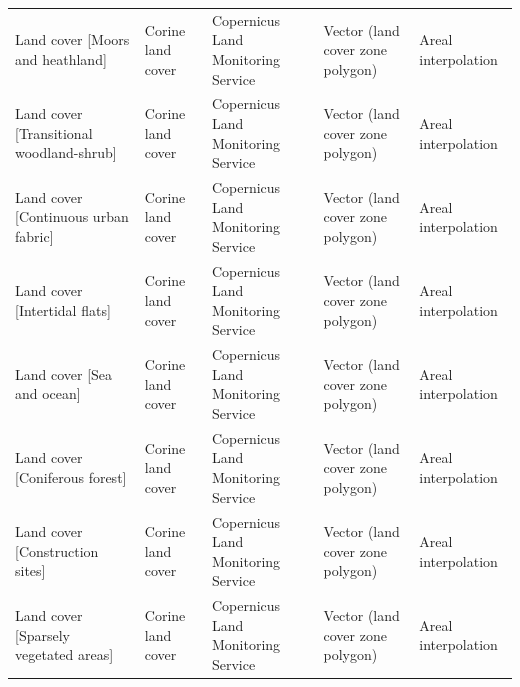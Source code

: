 \documentclass[fleqn,10pt]{wlscirep}
\begin{document}
\begin{longtable}{p{}p{}p{}p{}p{}}
                                                                        Land cover [Moors and heathland] &                  Corine land cover  &                                         Copernicus Land Monitoring Service  &  Vector (land cover zone polygon)  &                            Areal interpolation  \\
                                                                Land cover [Transitional woodland-shrub] &                  Corine land cover  &                                         Copernicus Land Monitoring Service  &  Vector (land cover zone polygon)  &                            Areal interpolation  \\
                                                                    Land cover [Continuous urban fabric] &                  Corine land cover  &                                         Copernicus Land Monitoring Service  &  Vector (land cover zone polygon)  &                            Areal interpolation  \\
                                                                            Land cover [Intertidal flats] &                  Corine land cover  &                                         Copernicus Land Monitoring Service  &  Vector (land cover zone polygon)  &                            Areal interpolation  \\
                                                                                Land cover [Sea and ocean] &                  Corine land cover  &                                         Copernicus Land Monitoring Service  &  Vector (land cover zone polygon)  &                            Areal interpolation  \\
                                                                            Land cover [Coniferous forest] &                  Corine land cover  &                                         Copernicus Land Monitoring Service  &  Vector (land cover zone polygon)  &                            Areal interpolation  \\
                                                                        Land cover [Construction sites] &                  Corine land cover  &                                         Copernicus Land Monitoring Service  &  Vector (land cover zone polygon)  &                            Areal interpolation  \\
                                                                    Land cover [Sparsely vegetated areas] &                  Corine land cover  &                                         Copernicus Land Monitoring Service  &  Vector (land cover zone polygon)  &                            Areal interpolation  \\

\end{longtable}
\end{document}
